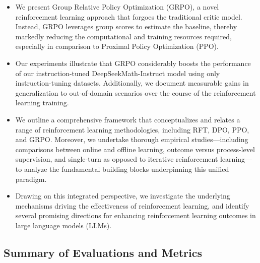 \begin{itemize}[topsep=0pt]
    \item We present Group Relative Policy Optimization (GRPO), a novel reinforcement learning approach that forgoes the traditional critic model. Instead, GRPO leverages group scores to estimate the baseline, thereby markedly reducing the computational and training resources required, especially in comparison to Proximal Policy Optimization (PPO).
    \item Our experiments illustrate that GRPO considerably boosts the performance of our instruction-tuned DeepSeekMath-Instruct model using only instruction-tuning datasets. Additionally, we document measurable gains in generalization to out-of-domain scenarios over the course of the reinforcement learning training.
    \item We outline a comprehensive framework that conceptualizes and relates a range of reinforcement learning methodologies, including RFT, DPO, PPO, and GRPO. Moreover, we undertake thorough empirical studies—including comparisons between online and offline learning, outcome versus process-level supervision, and single-turn as opposed to iterative reinforcement learning—to analyze the fundamental building blocks underpinning this unified paradigm.
    \item Drawing on this integrated perspective, we investigate the underlying mechanisms driving the effectiveness of reinforcement learning, and identify several promising directions for enhancing reinforcement learning outcomes in large language models (LLMs).
\end{itemize}

\subsection{Summary of Evaluations and Metrics}

